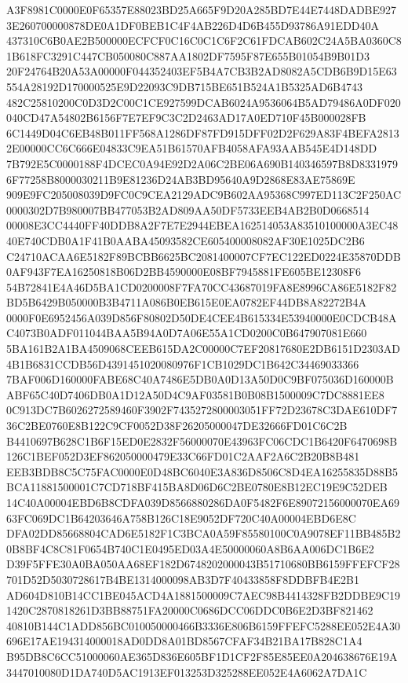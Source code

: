 \documentclass[UTF8,fontset=fandol,zihao=-4,a4paper]{ctexart}
\begin{document}
{{A3F8981C0000E0F65357E88023BD25A665F9D20A285BD7E44E7448DADBE9273E260700000878DE0A1DF0BEB1C4F4AB226D4D6B455D93786A91EDD40A
437310C6B0AE2B500000ECFCF0C16C0C1C6F2C61FDCAB602C24A5BA0360C81B618FC3291C447CB050080C887AA1802DF7595F87E655B01054B9B01D3
20F24764B20A53A00000F044352403EF5B4A7CB3B2AD8082A5CDB6B9D15E63554A28192D170000525E9D22093C9DB715BE651B524A1B5325AD6B4743
482C25810200C0D3D2C00C1CE927599DCAB6024A9536064B5AD79486A0DF020040CD47A54802B6156F7E7EF9C3C2D2463AD17A0ED710F45B000028FB
6C1449D04C6EB48B011FF568A1286DF87FD915DFF02D2F629A83F4BEFA28132E00000CC6C666E04833C9EA51B61570AFB4058AFA93AAB545E4D148DD
7B792E5C0000188F4DCEC0A94E92D2A06C2BE06A690B140346597B8D83319796F77258B8000030211B9E81236D24AB3BD95640A9D2868E83AE75869E
909E9FC205008039D9FC0C9CEA2129ADC9B602AA95368C997ED113C2F250AC0000302D7B980007BB477053B2AD809AA50DF5733EEB4AB2B0D0668514
00008E3CC4440FF40DDB8A2F7E7E2944EBEA162514053A83510100000A3EC4840E740CDB0A1F41B0AABA45093582CE605400008082AF30E1025DC2B6
C24710ACAA6E5182F89BCBB6625BC2081400007CF7EC122ED0224E35870DDB0AF943F7EA16250818B06D2BB4590000E08BF7945881FE605BE12308F6
54B72841E4A46D5BA1CD0200008F7FA70CC43687019FA8E8996CA86E5182F82BD5B6429B050000B3B4711A086B0EB615E0EA0782EF44DB8A82272B4A
0000F0E6952456A039D856F80802D50DE4CEE4B615334E53940000E0CDCB48AC4073B0ADF011044BAA5B94A0D7A06E55A1CD0200C0B647907081E660
5BA161B2A1BA4509068CEEB615DA2C00000C7EF20817680E2DB6151D2303AD4B1B6831CCDB56D4391451020080976F1CB1029DC1B642C34469033366
7BAF006D160000FABE68C40A7486E5DB0A0D13A50D0C9BF075036D160000BABF65C40D7406DB0A1D12A50D4C9AF03581B0B08B1500009C7DC8881EE8
0C913DC7B6026272589460F3902F7435272800003051FF72D23678C3DAE610DF736C2BE0760E8B122C9CF0052D38F26205000047DE32666FD01C6C2B
B4410697B628C1B6F15ED0E2832F56000070E43963FC06CDC1B6420F6470698B126C1BEF052D3EF862050000479E33C66FD01C2AAF2A6C2B20B8B481
EEB3BDB8C5C75FAC0000E0D48BC6040E3A836D8506C8D4EA16255835D88B5BCA11881500001C7CD718BF415BA8D06D6C2BE0780E8B12EC19E9C52DEB
14C40A00004EBD6B8CDFA039D8566880286DA0F5482F6E89072156000070EA6963FC069DC1B64203646A758B126C18E9052DF720C40A00004EBD6E8C
DFA02DD85668804CAD6E5182F1C3BCA0A59F85580100C0A9078EF11BB485B20B8BF4C8C81F0654B740C1E0495ED03A4E50000060A8B6AA006DC1B6E2
D39F5FFE30A0BA050AA68EF182D6748202000043B51710680BB6159FFEFCF28701D52D5030728617B4BE1314000098AB3D7F40433858F8DDBFB4E2B1
AD604D810B14CC1BE045ACD4A1881500009C7AEC98B4414328FB2DDBE9C191420C2870818261D3BB88751FA20000C0686DCC06DDC0B6E2D3BF821462
40810B144C1ADD856BC010050000466B3336E806B6159FFEFC5288EE052E4A30696E17AE194314000018AD0DD8A01BD8567CFAF34B21BA17B828C1A4
B95DB8C6CC51000060AE365D836E605BF1D1CF2F85E85EE0A204638676E19A3447010080D1DA740D5AC1913EF013253D325288EE052E4A6062A7DA1C
}}
\end{document}
